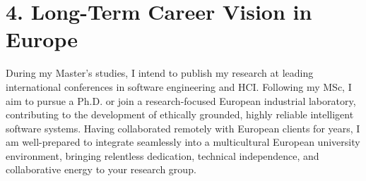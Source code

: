 \documentclass[10pt,a4paper]{article}
\begin{document}
\section{4. Long-Term Career Vision in Europe}
During my Master’s studies, I intend to publish my research at leading international conferences in software engineering and HCI. Following my MSc, I aim to pursue a Ph.D. or join a research-focused European industrial laboratory, contributing to the development of ethically grounded, highly reliable intelligent software systems. Having collaborated remotely with European clients for years, I am well-prepared to integrate seamlessly into a multicultural European university environment, bringing relentless dedication, technical independence, and collaborative energy to your research group.
\end{document}

